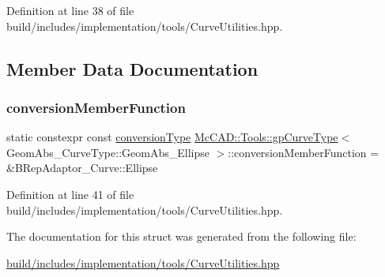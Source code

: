 Definition at line 38 of file build/includes/implementation/tools/\+Curve\+Utilities.\+hpp.



\subsection{Member Data Documentation}
\mbox{\label{structMcCAD_1_1Tools_1_1gpCurveType_3_01GeomAbs__CurveType_1_1GeomAbs__Ellipse_01_4_a2d0e1a980af92a4503032c3877d30015}} 
\subsubsection{\texorpdfstring{conversion\+Member\+Function}{conversionMemberFunction}}
{\footnotesize\ttfamily static constexpr const \hyperlink{structMcCAD_1_1Tools_1_1gpCurveType_3_01GeomAbs__CurveType_1_1GeomAbs__Ellipse_01_4_a0a0d12fadf9056491f9ea92a4f59b293}{conversion\+Type} \hyperlink{structMcCAD_1_1Tools_1_1gpCurveType}{Mc\+C\+A\+D\+::\+Tools\+::gp\+Curve\+Type}$<$ Geom\+Abs\+\_\+\+Curve\+Type\+::\+Geom\+Abs\+\_\+\+Ellipse $>$\+::conversion\+Member\+Function = \&B\+Rep\+Adaptor\+\_\+\+Curve\+::\+Ellipse\hspace{0.3cm}{\ttfamily [static]}}



Definition at line 41 of file build/includes/implementation/tools/\+Curve\+Utilities.\+hpp.



The documentation for this struct was generated from the following file\+:\begin{DoxyCompactItemize}
\item 
\hyperlink{build_2includes_2implementation_2tools_2CurveUtilities_8hpp}{build/includes/implementation/tools/\+Curve\+Utilities.\+hpp}\end{DoxyCompactItemize}
